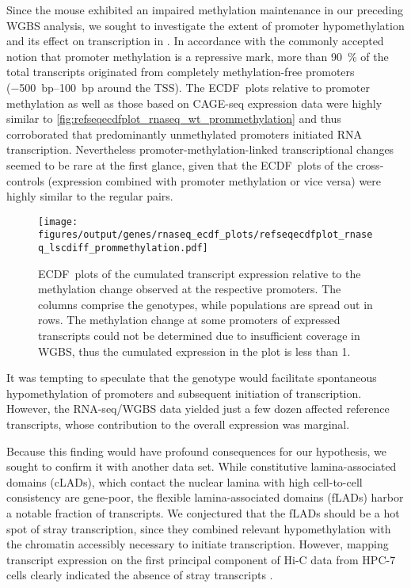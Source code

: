 Since the \dnmtchip mouse exhibited an impaired methylation maintenance in our preceding WGBS analysis, we sought to investigate the extent of promoter hypomethylation and its effect on transcription in \dnmtchip. In accordance with the commonly accepted notion that promoter methylation is a repressive mark, more than \SI{90}{\percent} of the total transcripts originated from completely methylation-free promoters (\SIrange{-500}{+100}{bp} around the TSS). The ECDF~plots relative to \dnmtchip promoter methylation as well as those based on CAGE-seq expression data were highly similar to \autoref{fig:refseqecdfplot_rnaseq_wt_prommethylation} and thus corroborated that predominantly unmethylated promoters initiated RNA transcription\dns. Nevertheless promoter-methylation-linked transcriptional changes seemed to be rare at the first glance, given that the ECDF~plots of the cross-controls (\dnmtchip expression combined with \dnmtwt promoter methylation or vice versa) were highly similar to the regular pairs. 


\begin{figure}[!ht]
	\centering
	\texttt{[image: figures/output/genes/rnaseq\_ecdf\_plots/refseqecdfplot\_rnaseq\_lscdiff\_prommethylation.pdf]} 
	\caption{ECDF~plots of the cumulated transcript expression relative to the methylation change observed at the respective promoters. The columns comprise the genotypes, while populations are spread out in rows. The methylation change at some promoters of expressed transcripts could not be determined due to insufficient coverage in WGBS, thus the cumulated expression in the plot is less than \num{1}.}
	\label{fig:refseqecdfplot_rnaseq_lscdiff_prommethylation}
\end{figure}



It was tempting to speculate that the \dnmtchip genotype would facilitate spontaneous hypomethylation of promoters and subsequent initiation of transcription. However, the RNA-seq/WGBS data yielded just a few dozen affected reference transcripts, whose contribution to the overall expression was marginal. 

Because this finding would have profound consequences for our hypothesis, we sought to confirm it with another data set. While constitutive lamina-associated domains (cLADs), which contact the nuclear lamina with high cell-to-cell consistency are gene-poor, the  flexible lamina-associated domains (fLADs) harbor a notable fraction of transcripts\cite{Guelen2008}. We conjectured that the fLADs should be a hot spot of stray transcription, since they combined relevant hypomethylation with the chromatin accessibly necessary to initiate transcription\cite{Leemans2019}. However, mapping transcript expression on the  first principal component\cite{Lieberman-Aiden2009} of Hi-C data from HPC-7 cells clearly indicated the absence of stray transcripts \supple. 

